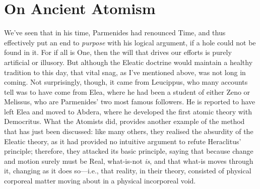 \section{On Ancient Atomism\label{sec_OAA}}
We've seen that in his time, Parmenides had renounced Time, and thus effectively put an end to \textit{purpose} with his logical argument, if a hole could not be found in it. For if all is One, then the will that drives our efforts is purely artificial or illusory. But although the Eleatic doctrine would maintain a healthy tradition to this day, that vital snag, as I've mentioned above, was not long in coming. Not surprisingly, though, it came from Leucippus, who many accounts tell was to have come from Elea, where he had been a student of either Zeno or Melissus, who are Parmenides' two most famous followers. He is reported to have left Elea and moved to Abdera, where he developed the first atomic theory with Democritus. What the Atomists did, provides another example of the method that has just been discussed: like many others, they realised the absurdity of the Eleatic theory, as it had provided no intuitive argument to refute Heraclitus' principle; therefore, they attacked its basic principle, saying that because change and motion surely must be Real, what-is-not \textit{is}, and that what-is moves through it, changing as it does so---i.e., that reality, in their theory, consisted of physical corporeal matter moving about in a physical incorporeal void.

